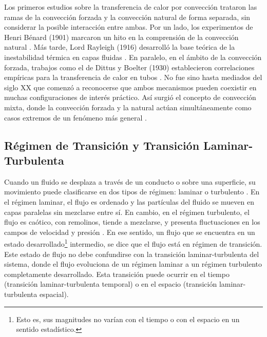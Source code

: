 Los primeros estudios sobre la transferencia de calor por convección trataron las ramas de la convección forzada y la convección natural de forma separada, sin considerar la posible interacción entre ambas. Por un lado, los experimentos de Henri Bénard (1901) marcaron un hito en la comprensión de la convección natural \cite{benard1901}. Más tarde, Lord Rayleigh (1916) desarrolló la base teórica de la inestabilidad térmica en capas fluidas \cite{rayleigh1916}. En paralelo, en el ámbito de la convección forzada, trabajos como el de Dittus y Boelter (1930) establecieron correlaciones empíricas para la transferencia de calor en tubos \cite{dittus1930}. No fue sino hasta mediados del siglo XX que comenzó a reconocerse que ambos mecanismos pueden coexistir en muchas configuraciones de interés práctico. Así surgió el concepto de convección mixta, donde la convección forzada y la natural actúan simultáneamente como casos extremos de un fenómeno más general \cite{metais1964}. 

\subsection*{Régimen de Transición y Transición Laminar-Turbulenta}

Cuando un fluido se desplaza a través de un conducto o sobre una superficie, su movimiento puede clasificarse en dos tipos de régimen: laminar o turbulento \cite{white}. En el régimen laminar, el flujo es ordenado y las partículas del fluido se mueven en capas paralelas sin mezclarse entre sí. En cambio, en el régimen turbulento, el flujo es caótico, con remolinos, tiende a mezclarse, y presenta fluctuaciones en los campos de velocidad y presión \cite{kundu}. En ese sentido, un flujo que se encuentra en un estado desarrollado\footnote{Esto es, sus magnitudes no varían con el tiempo o con el espacio en un sentido estadístico.} intermedio, se dice que el flujo está en régimen de transición. Este estado de flujo no debe confundirse con la transición laminar-turbulenta del sistema, donde el flujo evoluciona de un régimen laminar a un régimen turbulento completamente desarrollado. Esta transición puede ocurrir en el tiempo (transición laminar-turbulenta temporal) o en el espacio (transición laminar-turbulenta espacial).

